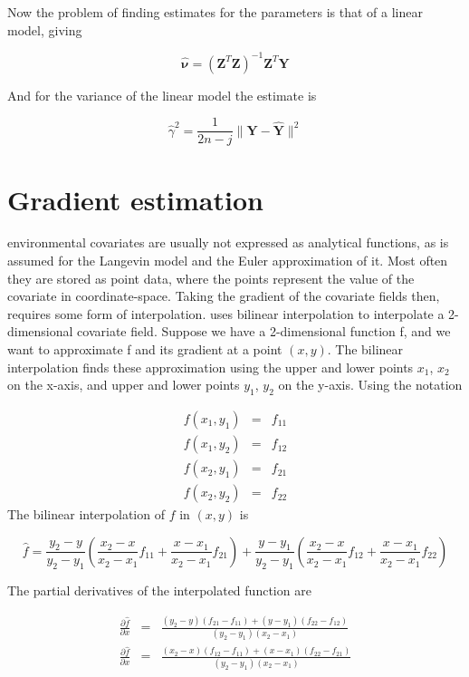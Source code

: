 Now the problem of finding estimates for the parameters is that of a linear model, giving

$$
\pmb{\hat{\nu}} = (\mathbf{Z}^T\mathbf{Z})^{-1}\mathbf{Z}^T \mathbf{Y}
$$

And for the variance of the linear model the estimate is

$$
\hat{\gamma}^2 = \frac{1}{2n-j} \lVert \mathbf{Y} - \mathbf{\hat{Y}} \rVert^2
$$

\section{Gradient estimation}
\label{gradient estimation}
environmental covariates are usually not expressed as analytical functions, as is assumed for the Langevin model and the Euler approximation of it. Most often they are stored as point data, where the points represent the value of the covariate in coordinate-space. Taking the gradient of the covariate fields then, requires some form of interpolation. \cite{michelot_langevin_2019} uses bilinear interpolation to interpolate a 2-dimensional covariate field. Suppose we have a 2-dimensional function f, and we want to approximate f and its gradient at a point $(x,y)$. The bilinear interpolation finds these approximation using the  upper and lower points $x_1$, $x_2$ on the x-axis, and upper and lower points $y_1$, $y_2$ on the y-axis. Using the notation 

$$
\begin{array}{lcl}
     f(x_1, y_1)& = & f_{11}  \\
     f(x_1, y_2)& = & f_{12}  \\
     f(x_2, y_1)& = & f_{21}  \\
     f(x_2, y_2)& = & f_{22}  
\end{array}
$$
The bilinear interpolation of $f$ in $(x,y)$ is  

$$
\hat{f} = \frac{y_2-y}{y_2-y_1}(\frac{x_2-x}{x_2-x_1}f_{11} + \frac{x-x_1}{x_2-x_1}f_{21}) + \frac{y-y_1}{y_2-y_1}(\frac{x_2-x}{x_2-x_1}f_{12} + \frac{x-x_1}{x_2-x_1}f_{22})
$$

The partial derivatives of the  interpolated function are

$$
\begin{array}{lcl} 
    \frac{\partial\hat{f}}{\partial x} & = & \frac{(y_2-y)(f_{21}-f_{11}) + (y-y_1)(f_{22}- f_{12})}{(y_2-y_1)(x_2-x_1)} \\
    \frac{\partial\hat{f}}{\partial x} & = & \frac{(x_2-x)(f_{12}-f_{11}) + (x-x_1)(f_{22}-f_{21})}{(y_2-y_1)(x_2-x_1)}
\end{array}
$$

